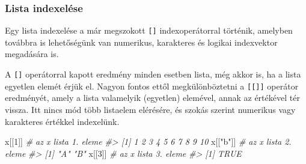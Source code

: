 \documentclass[
]{book}
\newenvironment{Shaded}{\begin{snugshade}}{\end{snugshade}}
\newcommand{\CommentTok}[1]{\textcolor[rgb]{0.56,0.35,0.01}{\textit{#1}}}
\newcommand{\DecValTok}[1]{\textcolor[rgb]{0.00,0.00,0.81}{#1}}
\newcommand{\FunctionTok}[1]{\textcolor[rgb]{0.00,0.00,0.00}{#1}}
\newcommand{\NormalTok}[1]{#1}
\newcommand{\StringTok}[1]{\textcolor[rgb]{0.31,0.60,0.02}{#1}}
\begin{document}
\hypertarget{lista-indexeluxe9se}{%
\subsubsection{Lista indexelése}\label{lista-indexeluxe9se}}

Egy lista indexelése a már megszokott \texttt{{[}{]}} indexoperátorral történik, amelyben továbbra is lehetőségünk van numerikus, karakteres és logikai indexvektor megadására is.

\begin{Shaded}
\end{Shaded}

A \texttt{{[}{]}} operátorral kapott eredmény minden esetben lista, még akkor is, ha a lista egyetlen elemét érjük el. Nagyon fontos ettől megkülönböztetni a \texttt{{[}{[}{]}{]}} operátor eredményét, amely a lista valamelyik (egyetlen) elemével, annak az értékével tér vissza. Itt nincs mód több listaelem elérésére, és szokás szerint numerikus vagy karakteres értékkel indexelünk.

\begin{Shaded}
\begin{Highlighting}[]
\NormalTok{x[[}\DecValTok{1}\NormalTok{]]     }\CommentTok{\# az x lista 1. eleme}
\CommentTok{\#\textgreater{}  [1]  1  2  3  4  5  6  7  8  9 10}
\NormalTok{x[[}\StringTok{"b"}\NormalTok{]]   }\CommentTok{\# az x lista 2. eleme}
\CommentTok{\#\textgreater{} [1] "A" "B"}
\NormalTok{x[[}\DecValTok{3}\NormalTok{]]     }\CommentTok{\# az x lista 3. eleme}
\CommentTok{\#\textgreater{} [1] TRUE}
\end{Highlighting}
\end{Shaded}
\end{document}
